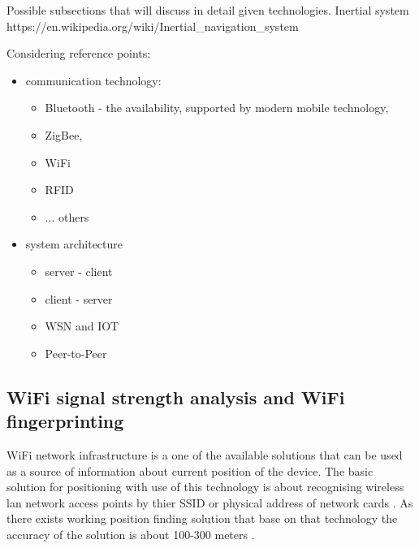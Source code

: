 \documentclass[../main.tex]{subfiles}
\begin{document}
Possible subsections that will discuss in detail given technologies.
Inertial system
https://en.wikipedia.org/wiki/Inertial_navigation_system

Considering reference points:
\begin{itemize}
	\item communication technology:
	\begin{itemize}
		\item Bluetooth - the availability, supported by modern mobile technology,
		\item ZigBee,
		\item WiFi
		\item RFID
		\item ... others
	\end{itemize}
	\item system architecture
	\begin{itemize}
		\item server - client
		\item client - server
		\item WSN and IOT
		\item Peer-to-Peer
	\end{itemize}
\end{itemize}



\subsection{WiFi signal strength analysis and WiFi fingerprinting} %
\label{sub:wifi_fingerprinting}

WiFi network infrastructure is a one of the available solutions that can be used as a source of information about current position of the device. The basic solution for positioning with use of this technology is about recognising wireless lan network access points by thier SSID or physical address of network cards \cite{WLAN_fingerprinting}. As there exists working position finding solution that base on that technology the accuracy of the solution is about 100-300 meters \cite{thesis_tablet_positioning}.
\end{document}
